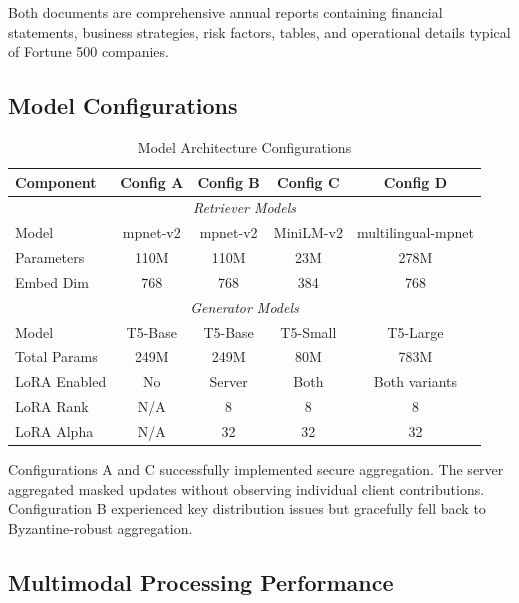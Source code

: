\documentclass[conference]{IEEEtran}
\begin{document}
Both documents are comprehensive annual reports containing financial statements, business strategies, risk factors, tables, and operational details typical of Fortune 500 companies.

\subsection{Model Configurations}

\begin{table}[h]
\centering
\caption{Model Architecture Configurations}
\label{tab:models}
\begin{tabular}{@{}lcccc@{}}
\toprule
\textbf{Component} & \textbf{Config A} & \textbf{Config B} & \textbf{Config C} & \textbf{Config D} \\
\midrule
\multicolumn{5}{c}{\textit{Retriever Models}} \\
\midrule
Model & mpnet-v2 & mpnet-v2 & MiniLM-v2 & multilingual-mpnet \\
Parameters & 110M & 110M & 23M & 278M \\
Embed Dim & 768 & 768 & 384 & 768 \\
\midrule
\multicolumn{5}{c}{\textit{Generator Models}} \\
\midrule
Model & T5-Base & T5-Base & T5-Small & T5-Large \\
Total Params & 249M & 249M & 80M & 783M \\
LoRA Enabled & No & Server & Both & Both variants \\
LoRA Rank & N/A & 8 & 8 & 8 \\
LoRA Alpha & N/A & 32 & 32 & 32 \\
\bottomrule
\end{tabular}
\end{table}

Configurations A and C successfully implemented secure aggregation. The server aggregated masked updates without observing individual client contributions. Configuration B experienced key distribution issues but gracefully fell back to Byzantine-robust aggregation.

\subsection{Multimodal Processing Performance}
\end{document}
